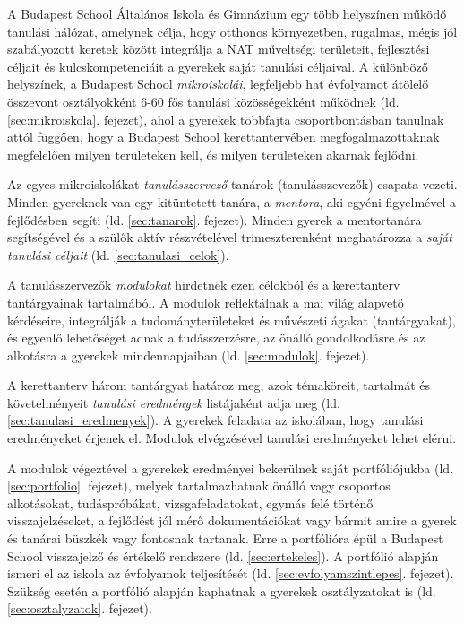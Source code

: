 A Budapest School Általános Iskola és Gimnázium egy több helyszínen működő
tanulási hálózat, amelynek célja, hogy otthonos környezetben, rugalmas, mégis
jól szabályozott keretek között integrálja a NAT
műveltségi
területeit, fejlesztési céljait és kulcskompetenciáit a gyerekek saját tanulási
céljaival. A különböző helyszínek, a Budapest
School \emph{mikroiskolái}, legfeljebb hat évfolyamot átölelő összevont
osztályokként
6-60 fős tanulási közösségekként működnek (ld. \ref{sec:mikroiskola}. fejezet),
ahol a gyerekek többfajta
csoportbontásban tanulnak attól függően, hogy a Budapest School
kerettantervében megfogalmazottaknak megfelelően milyen területeken kell, és
milyen területeken akarnak fejlődni.

Az egyes mikroiskolákat \emph{tanulásszervező} tanárok (tanulásszevezők)
csapata
vezeti.
Minden gyereknek van egy kitüntetett tanára, a \emph{mentora},
aki egyéni figyelmével a fejlődésben segíti
(ld. \ref{sec:tanarok}. fejezet).
Minden gyerek a mentortanára segítségével és a szülők aktív
részvételével trimeszterenként meghatározza a \emph{saját tanulási céljait}
(ld.
\ref{sec:tanulasi_celok}).

A tanulásszervezők \emph{modulokat} hirdetnek ezen célokból és a kerettanterv
tantárgyainak tartalmából. A modulok reflektálnak a
mai világ alapvető kérdéseire,
integrálják	a tudományterületeket és művészeti ágakat (tantárgyakat),
és egyenlő lehetőséget adnak a tudásszerzésre, az önálló gondolkodásre és az
alkotásra a gyerekek mindennapjaiban (ld. \ref{sec:modulok}. fejezet).

A kerettanterv három tantárgyat határoz meg, azok
témaköreit, tartalmát és követelményeit \emph{tanulási eredmények}
listájaként adja meg (ld. \ref{sec:tanulasi_eredmenyek}). A gyerekek feladata
az iskolában, hogy tanulási eredményeket
érjenek el. Modulok elvégzésével tanulási eredményeket lehet
elérni.

A modulok végeztével a gyerekek eredményei bekerülnek saját portfóliójukba (ld.
\ref{sec:portfolio}. fejezet),
melyek tartalmazhatnak önálló vagy csoportos alkotásokat, tudáspróbákat, vizsgafeladatokat,
egymás felé történő visszajelzéseket, a fejlődést jól mérő dokumentációkat vagy
bármit amire a gyerek és tanárai büszkék vagy fontosnak tartanak.
Erre a portfólióra épül a Budapest School visszajelző és értékelő rendszere
(ld. \ref{sec:ertekeles}). A
portfólió alapján ismeri el az iskola az évfolyamok teljesítését (ld. \ref{sec:evfolyamszintlepes}. fejezet). Szükség
esetén a portfólió alapján kaphatnak a gyerekek osztályzatokat is (ld. \ref{sec:osztalyzatok}. fejezet).

